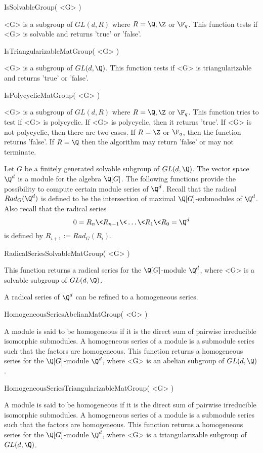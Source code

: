 \> IsSolvableGroup( <G> )

<G> is  a subgroup of $GL(d,R)$ where $R=\Q,\Z $ or $\F_q$.
This function tests if <G> is
solvable and returns 'true' or 'false'. 

\> IsTriangularizableMatGroup( <G> )

<G> is  a subgroup of $GL(d,\Q)$.
 This function tests if <G> is triangularizable 
and returns 'true' or 'false'. 

\> IsPolycyclicMatGroup( <G> )

<G> is  a subgroup of $GL(d,R)$ where $R=\Q,\Z $ or $\F_q$.
 This function tries to test if <G> is polycyclic. If <G> is polycyclic,
 then it returns 'true'. 
If <G> is not polycyclic, then there are two cases. If $R=\Z$ or $\F_q$,
then the function returns 'false'. If  $R=\Q$ then the algorithm may
return 'false' or may not terminate.

 

Let $G$ be a finitely generated solvable subgroup of $GL(d,\Q)$. The vector
space $\Q^d$ is a module for the algebra $\Q[G]$. The following
functions provide the possibility to compute certain module series of
$\Q^d$. Recall that the radical $Rad_G(\Q^d)$ is defined to be the
intersection of maximal $\Q[G]$-submodules of $\Q^d$. Also recall that the
radical series 
$$
0=R_n \< R_{n-1} \< \dots \< R_1 \< R_0=\Q^d 
$$
is defined by $R_{i+1}:= Rad_G(R_i)$. 

\> RadicalSeriesSolvableMatGroup( <G> )

This function returns a 
radical series for the $\Q[G]$-module $\Q^d$, where <G> is a
solvable subgroup of $GL(d,\Q)$.

A radical series of $\Q^d$ can be refined to a homogeneous series.

\> HomogeneousSeriesAbelianMatGroup( <G> )

A module is said to be homogeneous if it is the direct sum of pairwise
irreducible isomorphic submodules. A homogeneous series of a module 
is a submodule series such that the factors are homogeneous.
This function returns a 
homogeneous series for the $\Q[G]$-module $\Q^d$, where <G> is an
abelian subgroup of $GL(d,\Q)$.  

\> HomogeneousSeriesTriangularizableMatGroup( <G> )

A module is said to be homogeneous if it is the direct sum of pairwise
irreducible isomorphic submodules. A homogeneous series of a module 
is a submodule series such that the factors are homogeneous.
This function returns a 
homogeneous series for the $\Q[G]$-module $\Q^d$, where <G> is a
triangularizable subgroup of $GL(d,\Q)$.  

